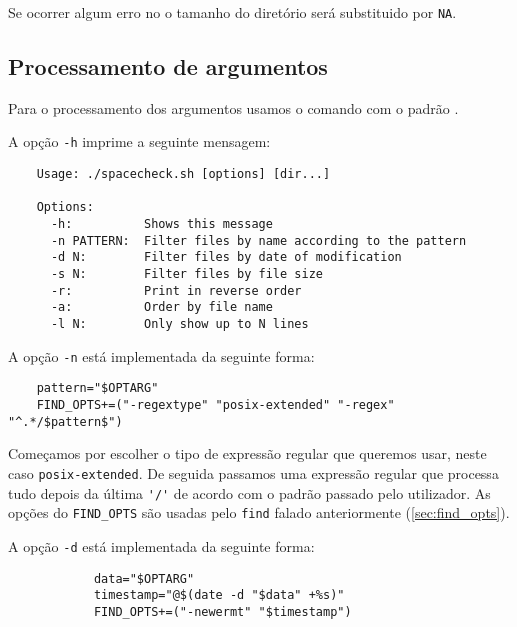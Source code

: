 Se ocorrer algum erro no  o tamanho do diretório será substituido por \Verb|NA|.

\subsection{Processamento de argumentos}\label{sec:args}

Para o processamento dos argumentos usamos o comando  com o padrão .

A opção \Verb|-h| imprime a seguinte mensagem:

\begin{listing}[H]
	\centering
	\begin{verbatim}
    Usage: ./spacecheck.sh [options] [dir...]

    Options:
      -h:          Shows this message
      -n PATTERN:  Filter files by name according to the pattern
      -d N:        Filter files by date of modification
      -s N:        Filter files by file size
      -r:          Print in reverse order
      -a:          Order by file name
      -l N:        Only show up to N lines
  \end{verbatim}
\end{listing}

A opção \Verb|-n| está implementada da seguinte forma:

\begin{listing}[H]
	\centering
	\begin{verbatim}
    pattern="$OPTARG"
    FIND_OPTS+=("-regextype" "posix-extended" "-regex" "^.*/$pattern$")
  \end{verbatim}
\end{listing}

Começamos por escolher o tipo de expressão regular que queremos usar, neste caso \Verb|posix-extended|.
De seguida passamos uma expressão regular que processa tudo depois da última \Verb|'/'| de acordo com o padrão passado pelo utilizador.
As opções do \Verb|FIND_OPTS| são usadas pelo \Verb|find| falado anteriormente (\ref{sec:find_opts}).

A opção \Verb|-d| está implementada da seguinte forma:

\begin{listing}[H]
	\centering
	\begin{verbatim}
			data="$OPTARG"
			timestamp="@$(date -d "$data" +%s)"
			FIND_OPTS+=("-newermt" "$timestamp")
  \end{verbatim}
\end{listing}

